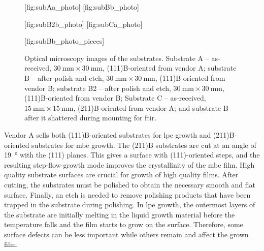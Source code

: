 \begin{figure}[htbp]
    \centering
    [fig:subAa_photo]
    \hfill
    [fig:subBb_photo]
    \par\bigskip
    [fig:subB2b_photo]
    \hfill
    [fig:subCa_photo]
    \par\bigskip
    [fig:subBb_photo_pieces]
    \caption[Optical microscopy images of the substrates.]{Optical microscopy images of the substrates.  Substrate A -- as-received, $\SI{30}{\milli\metre}\times\SI{30}{\milli\metre}$, (111)B-oriented from vendor A;  substrate B -- after polish and etch, $\SI{30}{\milli\metre}\times\SI{30}{\milli\metre}$, (111)B-oriented from vendor B;  substrate B2 -- after polish and etch, $\SI{30}{\milli\metre}\times\SI{30}{\milli\metre}$, (111)B-oriented from vendor B;  Substrate C -- as-received, $\SI{15}{\milli\metre}\times\SI{15}{\milli\metre}$, (211)B-oriented from vendor A; and  substrate B after it shattered during mounting for \ac{ftir}.}
    \label{fig:substrateABC}
\end{figure}


Vendor A sells both (111)B-oriented substrates for \ac{lpe} growth and (211)B-oriented substrates for \ac{mbe} growth. The (211)B substrates are cut at an angle of \SI{19}{\degree} with the (111) planes. This gives a surface with (111)-oriented steps, and the resulting step-flow-growth mode improves the crystallinity of the \ac{mbe} film. High quality substrate surfaces are crucial for growth of high quality films. After cutting, the substrates must be polished to obtain the necessary smooth and flat surface. Finally, an etch is needed to remove polishing products that have been trapped in the substrate during polishing. In \ac{lpe} growth, the outermost layers of the substrate are initially melting in the liquid growth material before the temperature falls and the film starts to grow on the surface. Therefore, some surface defects can be less important while others remain and affect the grown film.

